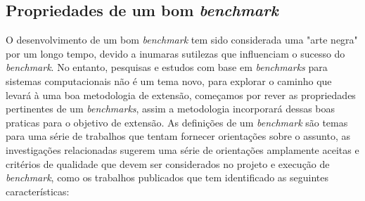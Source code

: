 \subsection{Propriedades de um bom \textit{benchmark}}
O desenvolvimento de um bom \textit{benchmark} tem sido considerada uma "arte negra" por um longo tempo, devido a inumaras sutilezas que influenciam o sucesso do \textit{benchmark}. 
No entanto, pesquisas e estudos com base em \textit{benchmarks} para sistemas computacionais não é um tema novo, para explorar o caminho que levará à uma boa metodologia de extensão, começamos por rever as propriedades pertinentes de um \textit{benchmarks}, assim a metodologia incorporará dessas boas praticas para o objetivo de extensão.
As definições de um \textit{benchmark} são temas para uma série de trabalhos que tentam fornecer orientações sobre o assunto, as investigações relacionadas sugerem uma série de orientações amplamente aceitas e critérios de qualidade que devem ser considerados no projeto e execução de \textit{benchmark}, como os trabalhos publicados \cite{Kistowski2015, Chen2014, Folkerts2013, Marco2012, Huppler2009, Gray1992} que tem identificado as seguintes características:


